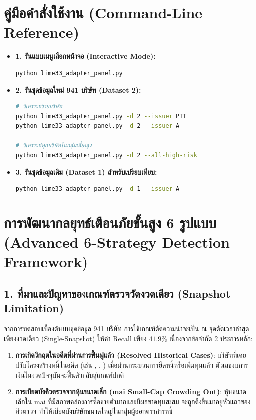 \documentclass[11pt,a4paper]{article}
\newcommand{\ft}[1]{\texttt{\detokenize{#1}}}
\begin{document}
\section{คู่มือคำสั่งใช้งาน (Command-Line Reference)}

\begin{itemize}[leftmargin=1.5em]
  \item \textbf{1. รันแบบเมนูเลือกหน้าจอ (Interactive Mode):}
\begin{lstlisting}[language=bash]
python lime33_adapter_panel.py
\end{lstlisting}

  \item \textbf{2. รันชุดข้อมูลใหม่ 941 บริษัท (Dataset 2):}
\begin{lstlisting}[language=bash]
# วิเคราะห์รายบริษัท
python lime33_adapter_panel.py -d 2 --issuer PTT
python lime33_adapter_panel.py -d 2 --issuer A

# วิเคราะห์ทุกบริษัทในกลุ่มเสี่ยงสูง
python lime33_adapter_panel.py -d 2 --all-high-risk
\end{lstlisting}

  \item \textbf{3. รันชุดข้อมูลเดิม (Dataset 1) สำหรับเปรียบเทียบ:}
\begin{lstlisting}[language=bash]
python lime33_adapter_panel.py -d 1 --issuer A
\end{lstlisting}
\end{itemize}

\newpage

\section{การพัฒนากลยุทธ์เตือนภัยขั้นสูง 6 รูปแบบ (Advanced 6-Strategy Detection Framework)}

\subsection{1. ที่มาและปัญหาของเกณฑ์ตรวจวัดงวดเดียว (Snapshot Limitation)}

จากการทดสอบเบื้องต้นบนชุดข้อมูล 941 บริษัท การใช้เกณฑ์ตัดความน่าจะเป็น ณ จุดตัดเวลาล่าสุดเพียงงวดเดียว (Single-Snapshot) ให้ค่า Recall เพียง $41.9\%$ เนื่องจากข้อจำกัด 2 ประการหลัก:
\begin{enumerate}[leftmargin=1.5em]
  \item \textbf{การเกิดวิกฤตในอดีตที่ผ่านการฟื้นฟูแล้ว (Resolved Historical Cases)}: บริษัทที่เคยปรับโครงสร้างหนี้ในอดีต (เช่น \ft{THAI}, \ft{EA}, \ft{ITD}) เมื่อผ่านกระบวนการยืดหนี้หรือเพิ่มทุนแล้ว ตัวเลขงบการเงินในงวดปัจจุบันจะฟื้นตัวกลับสู่เกณฑ์ปกติ
  \item \textbf{การเบียดบังคิวตรวจจากหุ้นขนาดเล็ก (mai Small-Cap Crowding Out)}: หุ้นขนาดเล็กใน mai ที่มีสภาพคล่องการซื้อขายต่ำมากและมีผลขาดทุนสะสม จะถูกดึงขึ้นมาอยู่หัวแถวของคิวตรวจ ทำให้เบียดบังบริษัทขนาดใหญ่ในกลุ่มผู้ออกตราสารหนี้
\end{enumerate}
\end{document}
